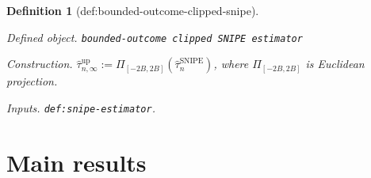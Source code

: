 \documentclass{article}
\newtheorem{definition}{Definition}
\begin{document}
\begin{definition}[def:bounded-outcome-clipped-snipe]\label{def:bounded-outcome-clipped-snipe}
\par\smallskip\noindent\emph{Defined object.} \texttt{bounded-\allowbreak{}outcome clipped SNIPE estimator}
\par\smallskip\noindent\emph{Construction.} \(\widehat\tau_{n,\infty}^{\mathrm{up}}:=\Pi_{[-2B,2B]}(\widehat\tau_n^{\mathrm{SNIPE}})\), where \(\Pi_{[-2B,2B]}\) is Euclidean projection.
\par\smallskip\noindent\emph{Inputs.} \texttt{def:\allowbreak{}snipe-\allowbreak{}estimator}.
\end{definition}

\section{Main results}
\end{document}
